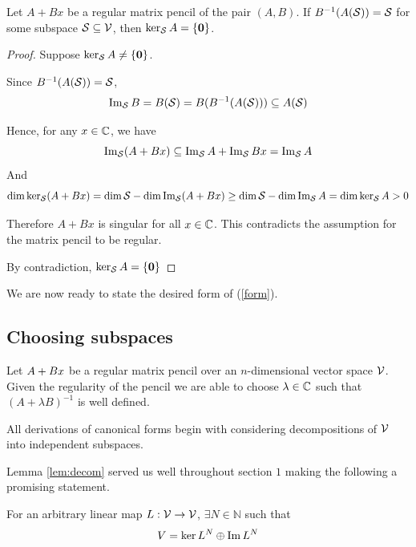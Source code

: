 \begin{lemma}\label{lem:inject}
    \label{lemma:regular_converge_inj}
    Let $A+Bx$ be a regular matrix pencil of the pair $(A,B)$. If $B^{-1}(A(\mathcal{S}))=\mathcal{S}$ for some subspace $\mathcal{S}\subseteq\mathcal{V}$, then $\ker_{\mathcal{S}}A=\{\mathbf{0}\}$.
\end{lemma}
\begin{proof}
    Suppose $\ker_{\mathcal{S}}A\neq\{\mathbf{0}\}$.

    Since $B^{-1}(A(\mathcal{S}))=\mathcal{S}$,
    \begin{equation*}
        \operatorname{Im}_{\mathcal{S}}B = B(\mathcal{S}) = B(B^{-1}(A(\mathcal{S}))) \subseteq A(\mathcal{S})
    \end{equation*}

    Hence, for any $x\in\mathbb{C}$, we have
    \begin{equation*}
        \operatorname{Im}_{\mathcal{S}}(A+Bx)\subseteq\operatorname{Im}_{\mathcal{S}}A+\operatorname{Im}_{\mathcal{S}}Bx=\operatorname{Im}_{\mathcal{S}}A
    \end{equation*}
    And
    \begin{equation*}
        \dim\ker_{\mathcal{S}}(A+Bx)=\dim\mathcal{S}-\dim\operatorname{Im}_{\mathcal{S}}(A+Bx)\ge\dim\mathcal{S}-\dim\operatorname{Im}_{\mathcal{S}}A=\dim\ker_{\mathcal{S}}A>0
    \end{equation*}

    Therefore $A+Bx$ is singular for all $x\in\mathbb{C}$.
    This contradicts the assumption for the matrix pencil to be regular.

    By contradiction, $\ker_{\mathcal{S}}A=\{\mathbf{0}\}$
\end{proof}

We are now ready to state the desired form of (\ref{form}).



\subsection{Choosing subspaces}\label{method2}

Let $A+Bx$ be a regular matrix pencil over an   $n$-dimensional vector space $\mathcal{V}$.
Given the regularity of the pencil we are able to choose $\lambda\in \mathbb{C}$ such that $(A+\lambda B)^{-1}$ is well defined.

All derivations of canonical forms begin with considering decompositions of $\mathcal{V}$ into independent subspaces.

Lemma \ref{lem:decom} served us well throughout section \(1\) making the following a promising statement.

\begin{lemma}\label{lem:decom2}
    For an arbitrary linear map $L:\mathcal{V}\rightarrow \mathcal{V}$, $\exists N\in\mathbb{N}$ such that $$V=\ker L^N \oplus \operatorname{Im} L^N$$
\end{lemma}

